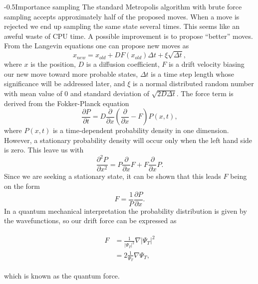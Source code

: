 \documentclass[english, a4paper]{article}
\makeatletter
\renewcommand{\subsubsection}{\@startsection{subsubsection}{3}{0pt}%
{-\baselineskip}{0.5\baselineskip}{\bf\large}}
\makeatother
\begin{document}
\subsubsection{Importance sampling} \label{importanceSampling}
The standard Metropolis algorithm with brute force sampling accepts approximately half of the proposed moves. 
When a move is rejected we end up sampling the same state several times. This seems like an aweful waste of CPU time.
A possible improvement is to propose   ``better'' moves. From the Langevin equations one can propose new moves as
\begin{equation}
	x_{new} = x_{old}+DF(x_{old})\Delta t +\xi\sqrt{\Delta t},	\label{importanceSamplingMove}
\end{equation}
where $x$ is the position, 
$D$ is a diffusion coefficient, 
$F$ is a drift velocity biasing our new move toward more probable states, 
$\Delta t$ is a time step length whose significance will be addressed later, 
and $\xi$ is a normal distributed random number with mean value of 0 and standard deviation of $\sqrt{2D\Delta t}$. 
The force term is derived from the Fokker-Planck equation 
\begin{equation}
	\frac{\partial P}{\partial t} = D\frac{\partial }{\partial x}\left(\frac{\partial }{\partial x} -F\right)P(x,t),
\end{equation}
where $P(x,t)$ is a time-dependent probability density in one dimension. However, a stationary probability density will occur only when the left hand side is zero.
This leave us with
\begin{equation}
	\frac{\partial^2 P}{\partial {x^2}} = P\frac{\partial}{\partial {x}}F + F\frac{\partial}{\partial {x}}P.
\end{equation}
Since we are seeking a stationary state, it can be shown that this leads $F$ being on the form
\begin{equation}
	F = \frac{1}{P} \frac{\partial P}{\partial x}.
\end{equation}
In a quantum mechanical interpretation the probability distribution is given by the wavefunctions, so our drift force can be expressed as

\begin{align}
	\begin{split}
	F &= \frac{1}{|\Psi_T|^2}\nabla|\Psi_T|^2\\
	&= 2\frac{1}{\Psi_T}\nabla\Psi_T,
	\end{split}
\end{align}

which is known as the quantum force.
\end{document}
